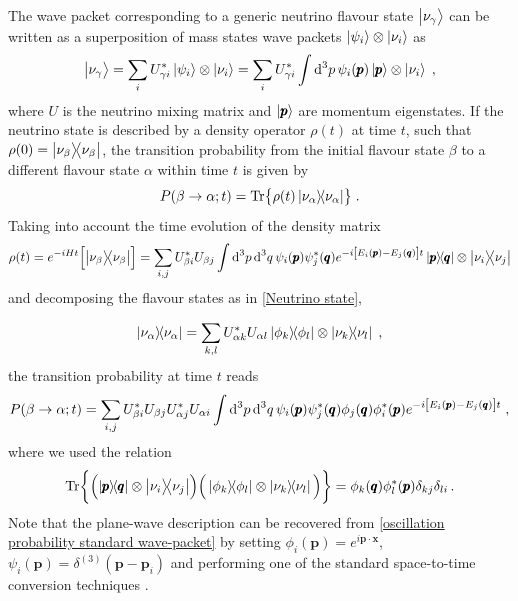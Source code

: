 \documentclass[11pt]{article}
\newcommand{\intt}[1]{\int\dd[3]{#1}}
\begin{document}
The wave packet corresponding to a generic neutrino flavour state $\ket{\nu_\gamma}$ can be written as a superposition of mass states wave packets $\ket{\psi_i} \otimes \ket{\nu_i}$ as 
\begin{equation}
    \ket{\nu_\gamma} = \sum_i U^*_{\gamma i} \ket{\psi_i}\otimes\ket{\nu_i} = \sum_i U^*_{\gamma i} \intt{p}\psi_i\qty(\pmb{p})\ket{\pmb{p}}\otimes\ket{\nu_i}\;,\label{Neutrino state}
\end{equation}
where $U$ is the neutrino mixing matrix and $\ket{\pmb{p}}$ are momentum eigenstates. If the neutrino state is described by a density operator $\rho(t)$ at time $t$, such that $\rho(0) = \ketbra{\nu_\beta}{\nu_\beta}$, the transition probability from the initial flavour state $\beta$ to a different flavour state $\alpha$ within time $t$ is given by 
\begin{equation}
    P(\beta\to\alpha;t) = \Tr{\rho(t)\ketbra{\nu_\alpha}{\nu_\alpha}}\;.
\end{equation}
Taking into account the time evolution of the density matrix
\begin{equation}
    \rho(t) = e^{-iHt} \qty[\ketbra{\nu_\beta}{\nu_\beta}] =
    \sum_{i,j} U_{\beta i}^* U_{\beta j} \int \text{d}^3p \,\text{d}^3 q\,\psi_i\qty(\pmb{p})\psi_j^*\qty(\pmb{q}) e^{-i\qty[E_i\qty(\pmb{p})-E_j\qty(\pmb{q})]t}\ketbra{\pmb{p}}{\pmb{q}}\otimes \ketbra{\nu_i}{\nu_j}\label{time evolution standard}
\end{equation}
and decomposing the flavour states as in \eqref{Neutrino state},

\begin{equation}
    \ketbra{\nu_\alpha}{\nu_\alpha} = \sum_{k,l} U_{\alpha k}^*U_{\alpha l} \ketbra{\phi_k}{\phi_l}\otimes \ketbra{\nu_k}{\nu_l}\;,
\end{equation}
the transition probability at time $t$ reads
\begin{equation}\label{oscillation probability standard wave-packet}
     P(\beta\to\alpha;t) = \sum_{i,j} U^*_{\beta i} U_{\beta j} U^*_{\alpha j} U_{\alpha i} \int \text{d}^3p \,\text{d}^3 q\,\psi_i\qty(\pmb{p})\psi_j^*\qty(\pmb{q})\phi_j\qty(\pmb{q})\phi_i^*\qty(\pmb{p})e^{-i\qty[E_i\qty(\pmb{p})-E_j\qty(\pmb{q})]t}\;,
\end{equation}
where we used the relation
\begin{equation}
    \Tr{\qty(\ketbra{\pmb{p}}{\pmb{q}}\otimes \ketbra{\nu_i}{\nu_j})\Big(\ketbra{\phi_k}{\phi_l}\otimes \ketbra{\nu_k}{\nu_l}\Big)} = \phi_k\qty(\pmb{q})\phi_l^*\qty(\pmb{p})\delta_{kj}\delta_{li}\,.
\end{equation}
Note that the plane-wave description can be recovered from \eqref{oscillation probability standard wave-packet} by setting $\phi_i(\pmb{p}) = e^{i\pmb{p}\cdot\pmb{x}}$, $\psi_i(\pmb{p}) = \delta^{(3)}(\pmb{p}-\pmb{p}_i)$ and performing one of the standard space-to-time conversion techniques \cite{Akhmedov:2009rb}. 
\end{document}
